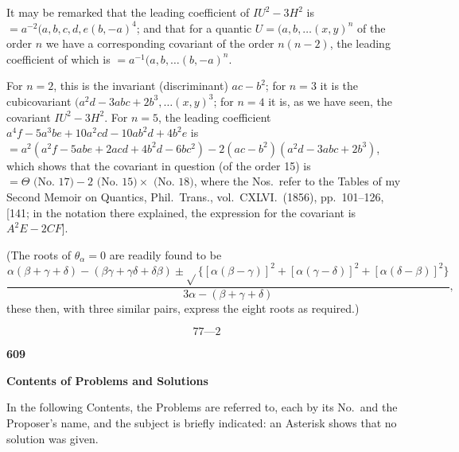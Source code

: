\documentclass[12pt,a4paper]{article}
\theoremstyle{plain}
\begin{document}
It may be remarked that the leading coefficient of $IU^2-3H^2$ is $=a^{-2}(a,b,c,d,e\!\!(b,-a)^4$; and that for a quantic $U=(a,b,\ldots\!(x,y)^n$ of the order $n$ we have a corresponding covariant of the order $n(n-2)$, the leading coefficient of which is $=a^{-1}(a,b,\ldots\!(b,-a)^n$.

For $n=2$, this is the invariant (discriminant) $ac-b^2$; for $n=3$ it is the cubicovariant $(a^2d-3abc+2b^3,\ldots\!(x,y)^3$; for $n=4$ it is, as we have seen, the covariant $IU^2-3H^2$. For $n=5$, the leading coefficient $a^4f-5a^3be+10a^2cd-10ab^2d+4b^2e$ is $=a^2(a^2f-5abe+2acd+4b^2d-6bc^2)-2(ac-b^2)(a^2d-3abc+2b^3)$, which shows that the covariant in question (of the order 15) is $=\Theta\text{ (No.~17)} - 2\text{ (No.~15)} \times \text{ (No.~18)}$, where the Nos.~refer to the Tables of my Second Memoir on Quantics, Phil.~Trans., vol.~CXLVI.~(1856), pp.~101--126, [141; in the notation there explained, the expression for the covariant is $A^2E-2CF$].

(The roots of $\theta_\alpha=0$ are readily found to be
\[\frac{\alpha(\beta+\gamma+\delta)-(\beta\gamma+\gamma\delta+\delta\beta) \pm \sqrt{}\{[\alpha(\beta-\gamma)]^2+[\alpha(\gamma-\delta)]^2+[\alpha(\delta-\beta)]^2\}}{3\alpha-(\beta+\gamma+\delta)},\]
these then, with three similar pairs, express the eight roots as required.)

\[77\text{---}2\]

\newpage
\noindent\textbf{609}

\vspace{0.5cm}

\noindent\textbf{Contents of Problems and Solutions}

\vspace{0.3cm}
\noindent In the following Contents, the Problems are referred to, each by its No.~and the Proposer's name, and the subject is briefly indicated: an Asterisk shows that no solution was given.
\end{document}
